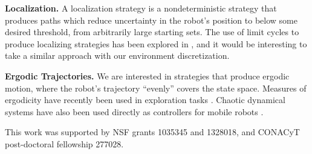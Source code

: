 \documentclass[sageh,times,Review]{sagej}
\begin{document}
\textbf{Localization.} A localization strategy is a nondeterministic strategy that 
produces paths which reduce uncertainty in the robot's position to below some
desired threshold, from arbitrarily large starting sets. The use of limit cycles
to produce localizing strategies has been explored in \cite{alam2018space}, and
it would be interesting to take a similar approach with our environment
discretization.

\textbf{Ergodic Trajectories.} 
We are interested in strategies that produce ergodic motion, where the robot's
trajectory ``evenly'' covers the state space. Measures
of ergodicity have recently been used in exploration tasks
\cite{miller2016ergodic}. Chaotic dynamical systems have also been used directly
as controllers for mobile robots \cite{nakamura2001chaotic}.

\begin{acks}
This work was supported by NSF grants 1035345 and 1328018, and CONACyT
post-doctoral fellowship 277028.
\end{acks}



\end{document}
